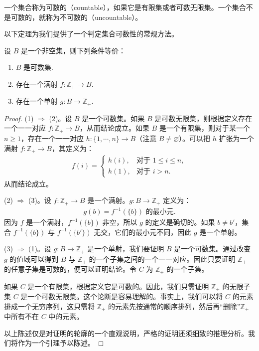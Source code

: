 \documentclass[../../main.tex]{subfiles}
\begin{document}
\begin{definition}[可数集与不可数集]\label{definition:ch01-可数集}
一个集合称为可数的（countable），如果它是有限集或者可数无限集。一个集合不是可数的，就称为不可数的（uncountable）。
\end{definition}

以下定理为我们提供了一个判定集合可数性的常规方法。

\begin{theorem}[可数集的判定]\label{theorem:ch01-可数判定}
设 $B$ 是一个非空集，则下列条件等价：
\begin{enumerate}[(1)]
\item $B$ 是可数集.
\item 存在一个满射 $f: \mathbb{Z}_{+} \longrightarrow B$.
\item 存在一个单射 $g: B \longrightarrow \mathbb{Z}_{+}$.
\end{enumerate}
\end{theorem}

\begin{proof}
(1) $\Longrightarrow$ (2)。设 $B$ 是一个可数集。如果 $B$ 是可数无限集，则根据定义存在一个一一对应 $f: \mathbb{Z}_{+} \longrightarrow B$，从而结论成立。如果 $B$ 是一个有限集，则对于某一个 $n \geqslant 1$，存在一个一一对应 $h: \{1, \cdots, n\} \longrightarrow B$（注意 $B \neq \varnothing$）。可以把 $h$ 扩张为一个满射 $f: \mathbb{Z}_{+} \longrightarrow B$，其定义为：
\begin{align*}
f(i) =
\begin{cases}
h(i), & \text{对于 } 1 \leqslant i \leqslant n,\\
h(1), & \text{对于 } i > n.
\end{cases}
\end{align*}
从而结论成立。

(2) $\Longrightarrow$ (3)。设 $f: \mathbb{Z}_{+} \longrightarrow B$ 是一个满射。$g: B \longrightarrow \mathbb{Z}_{+}$ 定义为：
\begin{align*}
g(b) = f^{-1}(\{b\}) \text{ 的最小元}.
\end{align*}
因为 $f$ 是一个满射，$f^{-1}(\{b\})$ 非空，所以 $g$ 的定义是确切的。如果 $b \neq b'$，集合 $f^{-1}(\{b\})$ 与 $f^{-1}(\{b'\})$ 无交，它们的最小元不同，因此 $g$ 是一个单射。

(3) $\Longrightarrow$ (1)。设 $g: B \longrightarrow \mathbb{Z}_{+}$ 是一个单射，我们要证明 $B$ 是一个可数集。通过改变 $g$ 的值域可以得到 $B$ 与 $\mathbb{Z}_{+}$ 的一个子集之间的一个一一对应。因此只要证明 $\mathbb{Z}_{+}$ 的任意子集是可数的，便可以证明结论。令 $C$ 为 $\mathbb{Z}_{+}$ 的一个子集。

如果 $C$ 是一个有限集，根据定义它是可数的。因此，我们只需证明 $\mathbb{Z}_{+}$ 的无限子集 $C$ 是一个可数无限集。这个论断是容易理解的。事实上，我们可以将 $C$ 的元素排成一个无穷序列，这只需将 $\mathbb{Z}_{+}$ 的元素先按通常的顺序排列，然后再“删除”$\mathbb{Z}_{+}$ 中所有不在 $C$ 中的元素。

以上陈述仅是对证明的轮廓的一个直观说明，严格的证明还须细致的推理分析。我们将作为一个引理予以陈述。
\end{proof}
\end{document}
